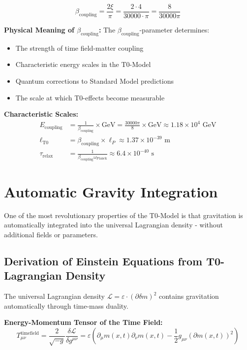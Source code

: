 \documentclass[12pt,a4paper]{report}
\newcommand{\mfield}{m(x,t)}  %
\newcommand{\xipar}{\xi}      %
\begin{document}
\begin{equation}\label{eq:beta_coupling}
	\beta_{\text{coupling}} = \frac{2\xipar}{\pi} = \frac{2 \cdot 4}{30000 \cdot \pi} = \frac{8}{30000\pi}
\end{equation}

\textbf{Physical Meaning of $\beta_{\text{coupling}}$:}
The $\beta_{\text{coupling}}$-parameter determines:
\begin{itemize}
	\item The strength of time field-matter coupling
	\item Characteristic energy scales in the T0-Model  
	\item Quantum corrections to Standard Model predictions
	\item The scale at which T0-effects become measurable
\end{itemize}

\textbf{Characteristic Scales:}
\begin{align}
	E_{\text{coupling}} &= \frac{1}{\beta_{\text{coupling}}} \times \text{GeV} = \frac{30000\pi}{8} \times \text{GeV} \approx 1.18 \times 10^{4} \text{ GeV} \\
	\ell_{\text{T0}} &= \beta_{\text{coupling}} \times \ell_P \approx 1.37 \times 10^{-39} \text{ m} \\
	\tau_{\text{relax}} &= \frac{1}{\beta_{\text{coupling}} \omega_{\text{Planck}}} \approx 6.4 \times 10^{-40} \text{ s}
\end{align}

\section{Automatic Gravity Integration}\label{sec:automatic_gravity}

One of the most revolutionary properties of the T0-Model is that gravitation is automatically integrated into the universal Lagrangian density - without additional fields or parameters.

\subsection{Derivation of Einstein Equations from T0-Lagrangian Density}\label{subsec:einstein_from_t0}

The universal Lagrangian density $\mathcal{L} = \varepsilon \cdot (\partial \delta m)^2$ contains gravitation automatically through time-mass duality.

\textbf{Energy-Momentum Tensor of the Time Field:}
\begin{equation}
	T_{\mu\nu}^{\text{timefield}} = \frac{2}{\sqrt{-g}} \frac{\delta \mathcal{L}}{\delta g^{\mu\nu}} = \varepsilon \left(\partial_\mu \mfield \partial_\nu \mfield - \frac{1}{2} g_{\mu\nu} (\partial \mfield)^2\right)
\end{equation}
\end{document}
